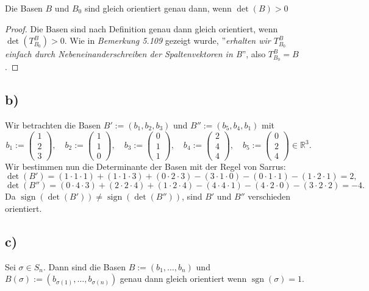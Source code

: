 \documentclass{article}
\DeclareMathOperator{\sign}{sign}
\DeclareMathOperator{\sgn}{sgn}
\begin{document}
Die Basen $B$ und $B_0$ sind gleich orientiert genau
dann, wenn $\det(B) > 0$

\begin{proof}
Die Basen sind nach Definition genau dann gleich orientiert,
wenn $\det(T^B_{B_0}) > 0$. Wie in \textit{Bemerkung 5.109}
gezeigt wurde, ''\textit{erhalten wir $T^B_{B_0}$
einfach durch Nebeneinanderschreiben der Spaltenvektoren in B}'',
also $T^B_{B_0} = B$.
\end{proof}

\subsection*{b)}
Wir betrachten die Basen
$B' := (b_1 , b_2 , b_3)$
und
$B'' := (b_5 , b_4 , b_1)$
mit
\[
b_1 := \begin{pmatrix} 1 \\ 2 \\ 3 \end{pmatrix}, \quad
b_2 := \begin{pmatrix} 1 \\ 1 \\ 0 \end{pmatrix}, \quad
b_3 := \begin{pmatrix} 0 \\ 1 \\ 1 \end{pmatrix}, \quad
b_4 := \begin{pmatrix} 2 \\ 4 \\ 4 \end{pmatrix}, \quad
b_5 := \begin{pmatrix} 0 \\ 2 \\ 4 \end{pmatrix} \in \mathbb{R}^3.
\]
Wir bestimmen nun die Determinante der Basen
mit der Regel von Sarrus:
\[
\det(B')
=
(1 \cdot 1 \cdot 1) + (1 \cdot 1 \cdot 3)
  + (0 \cdot 2 \cdot 3) - (3 \cdot 1 \cdot 0) - (0 \cdot 1
  \cdot 1) - (1 \cdot 2 \cdot 1)
= 2,
\]
\[
\det(B'')
=
(0 \cdot 4 \cdot 3) + (2 \cdot 2 \cdot 4)
  + (1 \cdot 2 \cdot 4) - (4 \cdot 4 \cdot 1) - (4 \cdot 2
  \cdot 0) - (3 \cdot 2 \cdot 2)
= -4.
\]
Da $\sign(\det(B')) \neq \sign(\det(B''))$,
sind $B'$ und $B''$ verschieden orientiert.


\subsection*{c)}
Sei $\sigma \in S_n$.
Dann sind die Basen $B := (b_1, \ldots, b_n)$
und $B(\sigma) := (b_{\sigma(1)}, \ldots, b_{\sigma(n)})$
genau dann gleich orientiert wenn 
$\sgn(\sigma) = 1$.
\end{document}
